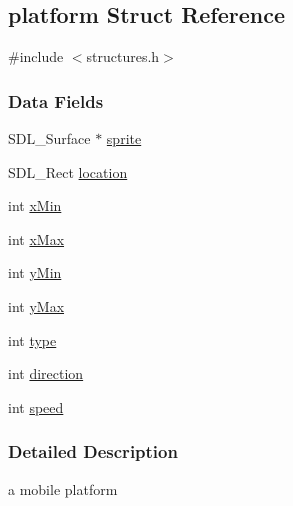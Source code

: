 \hypertarget{structplatform}{\subsection{platform Struct Reference}
\label{structplatform}
}


{\ttfamily \#include $<$structures.\-h$>$}

\subsubsection*{Data Fields}
\begin{DoxyCompactItemize}
\item 
S\-D\-L\-\_\-\-Surface $\ast$ \hyperlink{structplatform_a1c7252614a33238e51edd3bbd5fa08c5}{sprite}
\item 
S\-D\-L\-\_\-\-Rect \hyperlink{structplatform_a08e7ab1c2395b84bea7ca13eb99bac60}{location}
\item 
int \hyperlink{structplatform_aa91afe2b50db2f2fc786f4caf9f16f69}{x\-Min}
\item 
int \hyperlink{structplatform_af201ccbf3fe6a7e8274aa3eca22ac711}{x\-Max}
\item 
int \hyperlink{structplatform_abd0259c29e89b8f4ee318478bf207cf8}{y\-Min}
\item 
int \hyperlink{structplatform_a7ca443cbb568e95510880b6ec54dbe5e}{y\-Max}
\item 
int \hyperlink{structplatform_ac765329451135abec74c45e1897abf26}{type}
\item 
int \hyperlink{structplatform_a886d551d5381dc3e53f17825ffc51641}{direction}
\item 
int \hyperlink{structplatform_a218b4f7c6cc2681a99c23a3b089d68b1}{speed}
\end{DoxyCompactItemize}


\subsubsection{Detailed Description}
a mobile platform 

